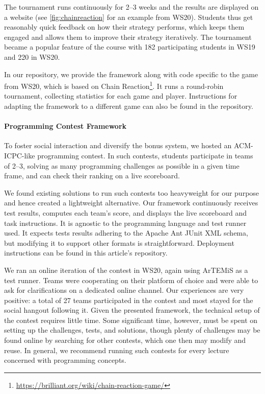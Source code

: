 The tournament runs continuously for 2--3 weeks and the results are displayed on a website (see \cref{fig:chainreaction} for an example from WS20).
Students thus get reasonably quick feedback on how their strategy performs,
which keeps them engaged and allows them to improve their strategy iteratively.
The tournament became a popular feature of the course with 182 participating students in WS19 and 220 in WS20.

In our repository, we provide the framework along with code specific to the game from WS20, which is based on Chain Reaction\footnote{\url{ https://brilliant.org/wiki/chain-reaction-game/}}.
It runs a round-robin tournament,
collecting statistics for each game and player.
Instructions for adapting the framework to a different game can also be found in the repository.

\paragraph{Programming Contest Framework}\label{sec:contest}
To foster social interaction and diversify the bonus system,
we hosted an ACM-ICPC-like programming contest.
In such contests, students
participate in teams of 2--3,
solving as many programming challenges as possible in a given time frame,
and can check their ranking on a live scoreboard.

We found existing solutions
to run such contests too heavyweight for our purpose
and hence created a lightweight alternative.
Our framework continuously receives test results,
computes each team's score,
and displays the live scoreboard and task instructions.
It is agnostic to the programming language and test runner used.
It expects tests results adhering to the Apache Ant JUnit XML schema,
but modifying it to support other formats is straightforward.
Deployment instructions can be found in this article's repository.

We ran an online iteration of the contest in WS20,
again using ArTEMiS as a test runner.
Teams were cooperating on their platform of choice
and were able to ask for clarifications on a dedicated online channel.
Our experiences are very positive:
a total of 27 teams participated in the contest
and most stayed for the social hangout following it.
Given the presented framework,
the technical setup of the contest requires little time.
Some significant time, however,
must be spent on setting up the challenges,
tests, and solutions,
though plenty of challenges may be found
online by searching for other contests,
which one then may modify and reuse.
In general, we recommend running such contests
for every lecture concerned with programming concepts.



